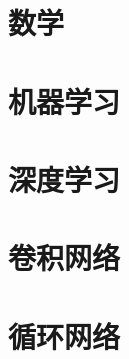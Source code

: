 \documentclass{ctexbook}
\begin{document}

\frontmatter


\tableofcontents
\mainmatter


\part{数学}



\part{机器学习}


\part{深度学习}

\part{卷积网络}

\part{循环网络}




\backmatter
\listoftables
\listoffigures
\end{document}
